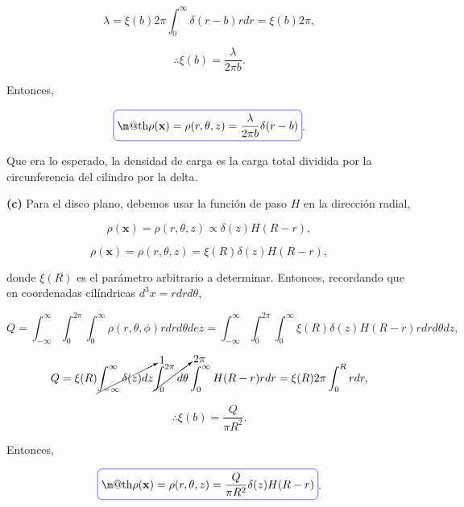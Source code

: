 \documentclass[a4paper,10pt]{article}
\makeatletter
\numberwithin{equation}{section}
\newcommand*{\boxcolor}{blue}
\renewcommand{\boxed}[1]{\textcolor{\boxcolor}{%
\tikz[baseline={([yshift=-1ex]current bounding box.center)}] \node [rectangle, minimum width=1ex,rounded corners,draw] {\normalcolor\m@th$\displaystyle#1$};}}
\makeatother
\begin{document}
\begin{equation}
 \lambda = \xi(b)2\pi \int_0^\infty \delta(r-b)rdr = \xi(b)2\pi,
\end{equation}

\begin{equation}
 \therefore \xi(b) = \frac{\lambda}{2\pi b}.
\end{equation}

Entonces, 

\begin{equation}
 \boxed{\rho(\mathbf{x}) =  \rho(r,\theta,z) = \frac{\lambda}{2\pi b}\delta(r - b)}.
\end{equation}

Que era lo esperado, la densidad de carga es la carga total dividida por la circunferencia 
del cilindro por la delta.

\textbf{(c)} Para el disco plano, debemos usar la función de paso $H$ en la dirección 
radial, 

\begin{equation}
 \rho(\mathbf{x}) =  \rho(r,\theta,z) \propto \delta(z)H(R-r),
\end{equation}

\begin{equation}
 \rho(\mathbf{x}) =  \rho(r,\theta,z) = \xi(R) \delta(z)H(R-r),
\end{equation}

donde $\xi(R)$ es el parámetro arbitrario a determinar. Entonces, recordando que 
en coordenadas cilíndricas $d^3x = rdr d\theta$, 

\begin{equation*}
 Q = \int_{-\infty}^{\infty}\int_0^{2\pi} \int_0^\infty 
  \rho(r,\theta,\phi) rdr d\theta dez = 
  \int_{-\infty}^{\infty} \int_0^{2\pi} \int_0^\infty \xi(R) \delta(z)H(R-r)
  r drd\theta dz,
\end{equation*}

\begin{equation}
 Q = \xi(R) \cancelto{1}{\int_{-\infty}^{\infty} \delta(z)dz} 
 \cancelto{2\pi}{\int_0^{2\pi} d\theta}
 \int_0^\infty H(R-r) r dr = \xi(R) 2\pi \int_0^R rdr,
\end{equation}

\begin{equation}
 \therefore \xi(b) = \frac{Q}{\pi R^2}.
\end{equation}

Entonces, 

\begin{equation}
 \boxed{\rho(\mathbf{x}) =  \rho(r,\theta,z) = \frac{Q}{\pi R^2}\delta(z)H(R-r)}.
\end{equation}
\end{document}
